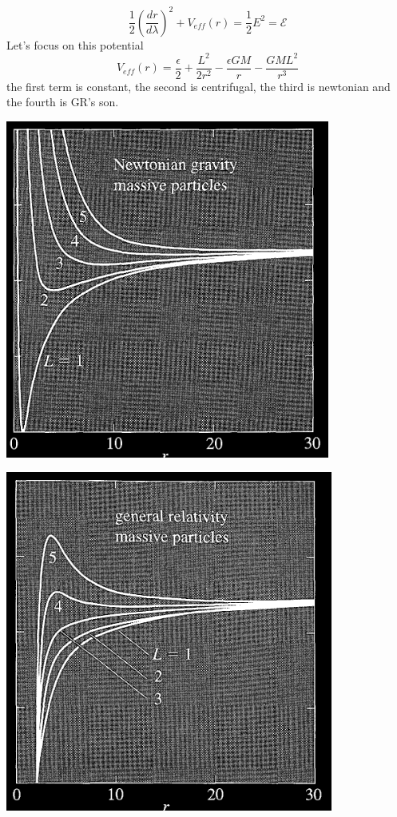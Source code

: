 \begin{equation}
\frac{1}{2} \left( \frac{d r}{d \lambda } \right)^{2} + V_{eff}\left( r \right) = \frac{1}{2}E^{2} = \mathcal{E} 
\end{equation}
Let's focus on this potential
\begin{equation}\label{eq:566}
V_{eff}\left( r \right) = \frac{\epsilon }{2} + \frac{L^{2}}{2r^{2}}- \frac{\epsilon GM}{r} - \frac{GML^{2}}{r^{3}}
\end{equation}
the first term is constant, the second is centrifugal, the third is newtonian and the fourth is GR's son.\par

\bigskip
\begin{minipage}{0.47\textwidth}
	\includegraphics[width=0.8\linewidth]{imm/newtmassive.png}
	\label{fig:sub1}
\end{minipage}
\hfill
\begin{minipage}{0.47\textwidth}\label{fig:vrvsr}
	 \includegraphics[width=0.8\linewidth]{imm/grmassive.png} 
	\label{fig:sub2}
 \end{minipage}
 \vspace{0.5cm}

